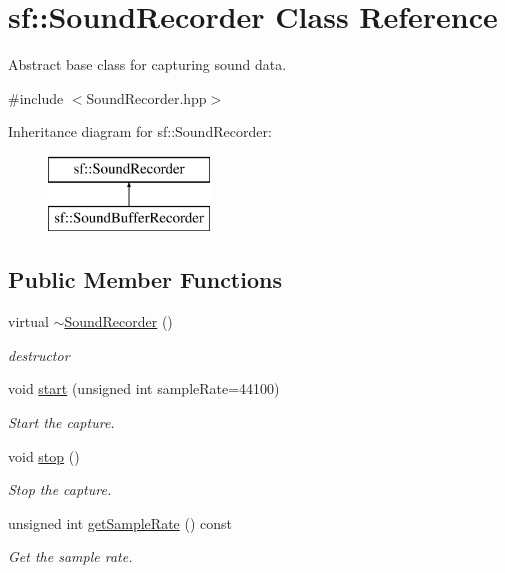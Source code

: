 \hypertarget{classsf_1_1SoundRecorder}{\section{sf\-:\-:Sound\-Recorder Class Reference}
\label{classsf_1_1SoundRecorder}
}


Abstract base class for capturing sound data.  




{\ttfamily \#include $<$Sound\-Recorder.\-hpp$>$}

Inheritance diagram for sf\-:\-:Sound\-Recorder\-:\begin{figure}[H]
\begin{center}
\leavevmode
\includegraphics[height=2.000000cm]{classsf_1_1SoundRecorder}
\end{center}
\end{figure}
\subsection*{Public Member Functions}
\begin{DoxyCompactItemize}
\item 
\hypertarget{classsf_1_1SoundRecorder_acc599e61aaa47edaae88cf43f0a43549}{virtual \hyperlink{classsf_1_1SoundRecorder_acc599e61aaa47edaae88cf43f0a43549}{$\sim$\-Sound\-Recorder} ()}\label{classsf_1_1SoundRecorder_acc599e61aaa47edaae88cf43f0a43549}

\begin{DoxyCompactList}\small\item\em destructor \end{DoxyCompactList}\item 
void \hyperlink{classsf_1_1SoundRecorder_a777e633114f7221cd7554a6ed486259e}{start} (unsigned int sample\-Rate=44100)
\begin{DoxyCompactList}\small\item\em Start the capture. \end{DoxyCompactList}\item 
void \hyperlink{classsf_1_1SoundRecorder_a8d9c8346aa9aa409cfed4a1101159c4c}{stop} ()
\begin{DoxyCompactList}\small\item\em Stop the capture. \end{DoxyCompactList}\item 
unsigned int \hyperlink{classsf_1_1SoundRecorder_a1f3726cbe0a2b2b291b36beea57960d7}{get\-Sample\-Rate} () const 
\begin{DoxyCompactList}\small\item\em Get the sample rate. \end{DoxyCompactList}\end{DoxyCompactItemize}
